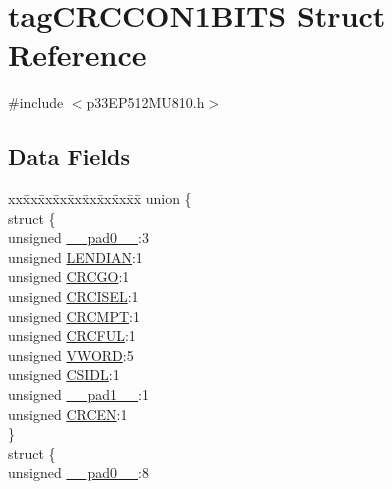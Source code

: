 \hypertarget{structtag_c_r_c_c_o_n1_b_i_t_s}{}\section{tag\+C\+R\+C\+C\+O\+N1\+B\+I\+TS Struct Reference}
\label{structtag_c_r_c_c_o_n1_b_i_t_s}


{\ttfamily \#include $<$p33\+E\+P512\+M\+U810.\+h$>$}

\subsection*{Data Fields}
\begin{DoxyCompactItemize}
\item 
\begin{tabbing}
xx\=xx\=xx\=xx\=xx\=xx\=xx\=xx\=xx\=\kill
union \{\\
\>struct \{\\
\>\>unsigned \hyperlink{structtag_c_r_c_c_o_n1_b_i_t_s_adf71f3d8410c1f1dbbc96680a92c49af}{\_\_pad0\_\_}:3\\
\>\>unsigned \hyperlink{structtag_c_r_c_c_o_n1_b_i_t_s_abdf55314dda510ce02f16d3cc947ea07}{LENDIAN}:1\\
\>\>unsigned \hyperlink{structtag_c_r_c_c_o_n1_b_i_t_s_a4341f51a1f4bc552ffaa62f888a38329}{CRCGO}:1\\
\>\>unsigned \hyperlink{structtag_c_r_c_c_o_n1_b_i_t_s_a0395915d685efd08811b70f2bf0e846e}{CRCISEL}:1\\
\>\>unsigned \hyperlink{structtag_c_r_c_c_o_n1_b_i_t_s_abcdb76c038466d6a8d10ce4a4a882cb7}{CRCMPT}:1\\
\>\>unsigned \hyperlink{structtag_c_r_c_c_o_n1_b_i_t_s_ac15e54ab643ca504216293f5b3f7dba6}{CRCFUL}:1\\
\>\>unsigned \hyperlink{structtag_c_r_c_c_o_n1_b_i_t_s_a86ab4f94a38644a4f19bbc5f86f4555b}{VWORD}:5\\
\>\>unsigned \hyperlink{structtag_c_r_c_c_o_n1_b_i_t_s_a2180358be897944fe29e49fe5d608d70}{CSIDL}:1\\
\>\>unsigned \hyperlink{structtag_c_r_c_c_o_n1_b_i_t_s_acaf2d0924a107ec6e8d2e31febaf66f9}{\_\_pad1\_\_}:1\\
\>\>unsigned \hyperlink{structtag_c_r_c_c_o_n1_b_i_t_s_a2825fc34cc09f9dbdad4dc45cb1742ff}{CRCEN}:1\\
\>\} \\
\>struct \{\\
\>\>unsigned \hyperlink{structtag_c_r_c_c_o_n1_b_i_t_s_adf71f3d8410c1f1dbbc96680a92c49af}{\_\_pad0\_\_}:8\\

\end{tabbing}
\end{DoxyCompactItemize}
